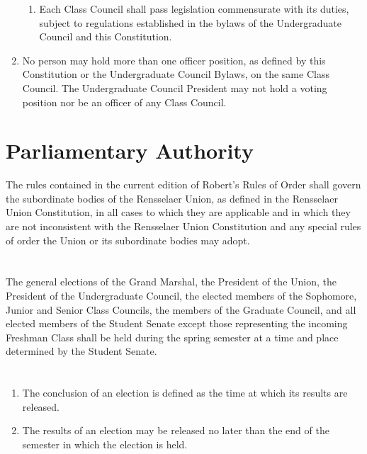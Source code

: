 \documentclass[12pt]{constitution}
\begin{document}
\begin{enumerate}
\begin{enumerate}
\item Each Class Council shall pass legislation commensurate with its duties, subject to regulations established in the bylaws of the Undergraduate Council and this Constitution.
\end{enumerate}
\item No person may hold more than one officer position, as defined by this Constitution or the Undergraduate Council Bylaws, on the same Class Council. The Undergraduate Council President may not hold a voting position nor be an officer of any Class Council.
\end{enumerate}

\section{Parliamentary Authority}
The rules contained in the current edition of Robert's Rules of Order shall govern the subordinate bodies of the Rensselaer Union, as defined in the Rensselaer Union Constitution, in all cases to which they are applicable and in which they are not inconsistent with the Rensselaer Union Constitution and any special rules of order the Union or its subordinate bodies may adopt.

\section{}
The general elections of the Grand Marshal, the President of the Union, the President of the Undergraduate Council, the elected members of the Sophomore, Junior and Senior Class Councils, the members of the Graduate Council, and all elected members of the Student Senate except those representing the incoming Freshman Class shall be held during the spring semester at a time and place determined by the Student Senate.

\section{}
\begin{enumerate}
\item The conclusion of an election is defined as the time at which its results are released.
\item The results of an election may be released no later than the end of the semester in which the
election is held.
\end{enumerate}
\end{document}
